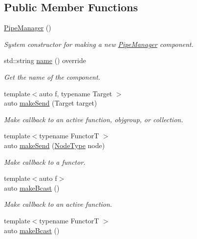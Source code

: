 \subsection*{Public Member Functions}
\begin{DoxyCompactItemize}
\item 
\hyperlink{structvt_1_1pipe_1_1_pipe_manager_aa2cf0e54dc146056c077aba1aa2ae42b}{Pipe\+Manager} ()
\begin{DoxyCompactList}\small\item\em System constructor for making a new \hyperlink{structvt_1_1pipe_1_1_pipe_manager}{Pipe\+Manager} component. \end{DoxyCompactList}\item 
std\+::string \hyperlink{structvt_1_1pipe_1_1_pipe_manager_aad60c922d604dd1b9ff47e428d265eed}{name} () override
\begin{DoxyCompactList}\small\item\em Get the name of the component. \end{DoxyCompactList}\item 
{\footnotesize template$<$auto f, typename Target $>$ }\\auto \hyperlink{structvt_1_1pipe_1_1_pipe_manager_a3c6313a04c8ba283f4c32986ff8c7c30}{make\+Send} (Target target)
\begin{DoxyCompactList}\small\item\em Make callback to an active function, objgroup, or collection. \end{DoxyCompactList}\item 
{\footnotesize template$<$typename FunctorT $>$ }\\auto \hyperlink{structvt_1_1pipe_1_1_pipe_manager_ac445facb2e7ba2bceb000d92a59d9e7e}{make\+Send} (\hyperlink{namespacevt_a866da9d0efc19c0a1ce79e9e492f47e2}{Node\+Type} node)
\begin{DoxyCompactList}\small\item\em Make callback to a functor. \end{DoxyCompactList}\item 
{\footnotesize template$<$auto f$>$ }\\auto \hyperlink{structvt_1_1pipe_1_1_pipe_manager_a5b124c9c765e8b3bb9aca1b367e45db2}{make\+Bcast} ()
\begin{DoxyCompactList}\small\item\em Make callback to an active function. \end{DoxyCompactList}\item 
{\footnotesize template$<$typename FunctorT $>$ }\\auto \hyperlink{structvt_1_1pipe_1_1_pipe_manager_a5b124c9c765e8b3bb9aca1b367e45db2}{make\+Bcast} ()

\end{DoxyCompactItemize}
